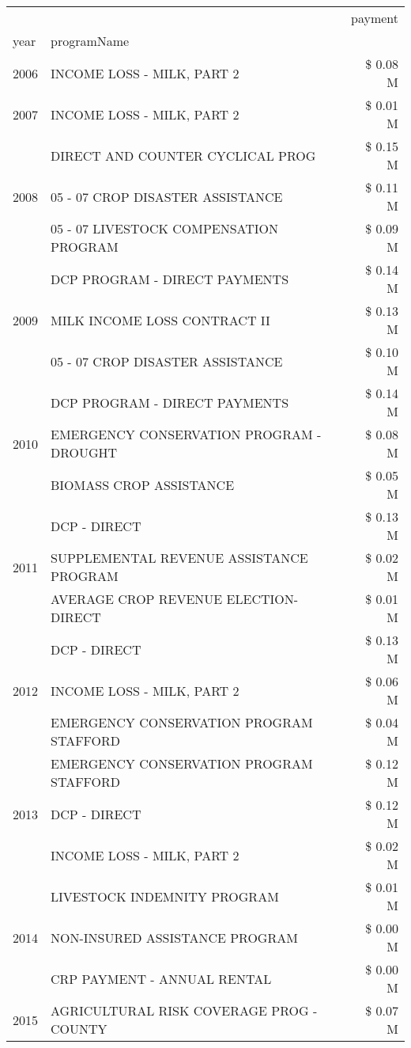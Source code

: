 \begin{tabular}{llr}
\toprule
 &  & payment \\
year & programName &  \\
\midrule
2006 & INCOME LOSS - MILK, PART 2 & \$ 0.08 M \\
\cline{1-3}
2007 & INCOME LOSS - MILK, PART 2 & \$ 0.01 M \\
\cline{1-3}
\multirow[t]{3}{*}{2008} & DIRECT AND COUNTER CYCLICAL PROG & \$ 0.15 M \\
 & 05 - 07 CROP DISASTER ASSISTANCE & \$ 0.11 M \\
 & 05 - 07 LIVESTOCK COMPENSATION PROGRAM & \$ 0.09 M \\
\cline{1-3}
\multirow[t]{3}{*}{2009} & DCP PROGRAM - DIRECT PAYMENTS & \$ 0.14 M \\
 & MILK INCOME LOSS CONTRACT II & \$ 0.13 M \\
 & 05 - 07 CROP DISASTER ASSISTANCE & \$ 0.10 M \\
\cline{1-3}
\multirow[t]{3}{*}{2010} & DCP PROGRAM - DIRECT PAYMENTS & \$ 0.14 M \\
 & EMERGENCY CONSERVATION PROGRAM - DROUGHT & \$ 0.08 M \\
 & BIOMASS CROP ASSISTANCE & \$ 0.05 M \\
\cline{1-3}
\multirow[t]{3}{*}{2011} & DCP - DIRECT & \$ 0.13 M \\
 & SUPPLEMENTAL REVENUE ASSISTANCE PROGRAM & \$ 0.02 M \\
 & AVERAGE CROP REVENUE ELECTION-DIRECT & \$ 0.01 M \\
\cline{1-3}
\multirow[t]{3}{*}{2012} & DCP - DIRECT & \$ 0.13 M \\
 & INCOME LOSS - MILK, PART 2 & \$ 0.06 M \\
 & EMERGENCY CONSERVATION PROGRAM STAFFORD & \$ 0.04 M \\
\cline{1-3}
\multirow[t]{3}{*}{2013} & EMERGENCY CONSERVATION PROGRAM STAFFORD & \$ 0.12 M \\
 & DCP - DIRECT & \$ 0.12 M \\
 & INCOME LOSS - MILK, PART 2 & \$ 0.02 M \\
\cline{1-3}
\multirow[t]{3}{*}{2014} & LIVESTOCK INDEMNITY PROGRAM & \$ 0.01 M \\
 & NON-INSURED ASSISTANCE PROGRAM & \$ 0.00 M \\
 & CRP PAYMENT - ANNUAL RENTAL & \$ 0.00 M \\
\cline{1-3}
\multirow[t]{3}{*}{2015} & AGRICULTURAL RISK COVERAGE PROG - COUNTY & \$ 0.07 M \\

\end{tabular}
